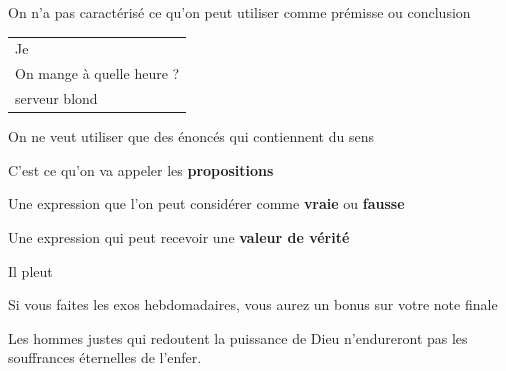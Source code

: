 
\begin{frame}
	
	\begin{description}[labelindent=6pt,style=multiline,leftmargin=1.3in]
		 \setlength\itemsep{1.4em}
\pause
\item[Hein ?] On n'a pas caractérisé ce qu'on peut utiliser comme prémisse ou conclusion
\pause
\item[Exemple] \begin{tabular}{l}
Je\\
On mange à quelle heure ?\\ \cline{1-1}
serveur blond\\
\end{tabular}
\pause \newline
\item[Idée] On ne veut utiliser que des énoncés qui contiennent du sens 

\pause
\item[] C'est ce qu'on va appeler les \textbf{propositions}
	\end{description}
\end{frame}



\begin{frame}
	
	\begin{description}[labelindent=6pt,style=multiline,leftmargin=1.3in]
		 \setlength\itemsep{1.4em}

\item[Intuitivement] Une expression que l'on peut considérer comme \textbf{vraie} ou \textbf{fausse}
\pause
\item[Techniquement] Une expression qui peut recevoir une \textbf{valeur de vérité} 
\pause
\item[Exemples] Il pleut \pause
\item[] Si vous faites les exos hebdomadaires, vous aurez un bonus sur votre note finale \pause
\end{description}
 Les hommes justes qui redoutent la puissance de Dieu n’endureront pas les
souffrances éternelles de l’enfer.
\end{frame}


